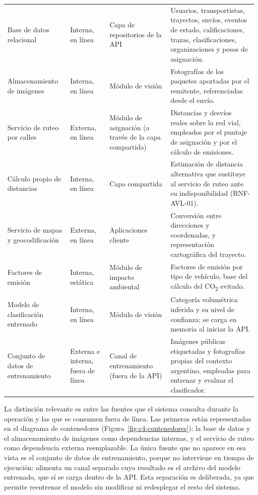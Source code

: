 {\begin{longtable}{p{3.3cm}p{2.1cm}p{3.2cm}p{4.6cm}}
    Base de datos relacional & Interna, en línea & Capa de repositorios de la API & Usuarios, transportistas, trayectos, envíos, eventos de estado, calificaciones, trazas, clasificaciones, organizaciones y pesos de asignación. \\
    Almacenamiento de imágenes & Interna, en línea & Módulo de visión & Fotografías de los paquetes aportadas por el remitente, referenciadas desde el envío. \\
    Servicio de ruteo por calles & Externa, en línea & Módulo de asignación (a través de la capa compartida) & Distancias y desvíos reales sobre la red vial, empleados por el puntaje de asignación y por el cálculo de emisiones. \\
    Cálculo propio de distancias & Interna, en línea & Capa compartida & Estimación de distancia alternativa que sustituye al servicio de ruteo ante su indisponibilidad (RNF-AVL-01). \\
    Servicio de mapas y geocodificación & Externa, en línea & Aplicaciones cliente & Conversión entre direcciones y coordenadas, y representación cartográfica del trayecto. \\
    Factores de emisión & Interna, estática & Módulo de impacto ambiental & Factores de emisión por tipo de vehículo, base del cálculo del CO\textsubscript{2} evitado. \\
    Modelo de clasificación entrenado & Interna, en línea & Módulo de visión & Categoría volumétrica inferida y su nivel de confianza; se carga en memoria al iniciar la API. \\
    Conjunto de datos de entrenamiento & Externa e interna, fuera de línea & Canal de entrenamiento (fuera de la API) & Imágenes públicas etiquetadas y fotografías propias del contexto argentino, empleadas para entrenar y evaluar el clasificador. \\
\end{longtable}

La distinción relevante es entre las fuentes que el sistema consulta durante la operación y las que se consumen fuera de línea. Las primeras están representadas en el diagrama de contenedores (Figura~\ref{fig:c4-contenedores}): la base de datos y el almacenamiento de imágenes como dependencias internas, y el servicio de ruteo como dependencia externa reemplazable. La única fuente que no aparece en esa vista es el conjunto de datos de entrenamiento, porque no interviene en tiempo de ejecución: alimenta un canal separado cuyo resultado es el archivo del modelo entrenado, que sí se carga dentro de la API. Esta separación es deliberada, ya que permite reentrenar el modelo sin modificar ni redesplegar el resto del sistema.

}
